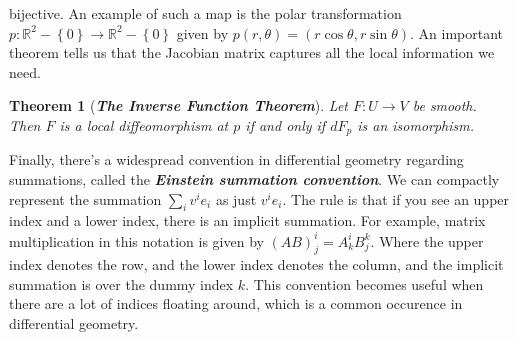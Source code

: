 \documentclass[psamsfonts]{amsart}
\newtheorem{thm}{Theorem}[section]
\theoremstyle{definition}
\theoremstyle{remark}
\newcommand{\R}{\mathbb{R}}
\newcommand{\ib}[1]{\textbf{\textit{#1}}}
\newcommand{\set}[1]{\left\lbrace #1 \right\rbrace}
\begin{document}
bijective. An example of such a map is the polar transformation
$p : \R^2-\set{0} \to \R^2-\set{0}$ given by
$p(r,\theta) = (r\cos\theta,r\sin\theta)$. An important theorem tells us
that the Jacobian matrix captures all the local information we need.
%
\begin{thm}[\ib{The Inverse Function Theorem}]
	Let $F : U \to V$ be smooth. Then $F$ is a local diffeomorphism at $p$ if
	and only if $dF_p$ is an isomorphism.
\end{thm}
%
Finally, there's a widespread convention in differential geometry
regarding summations, called the \ib{Einstein summation convention}. We
can compactly represent the summation $\sum_i v^ie_i$ as just $v^ie_i$.
The rule is that if you see an upper index and a lower index, there is
an implicit summation. For example, matrix multiplication in this
notation is given by $(AB)^i_j = A^i_kB^k_j$. Where the upper index denotes
the row, and the lower index denotes the column, and the implicit
summation is over the dummy index $k$. This convention becomes
useful when there are a lot of indices floating around, which is
a common occurence in differential geometry.
%
\end{document}
